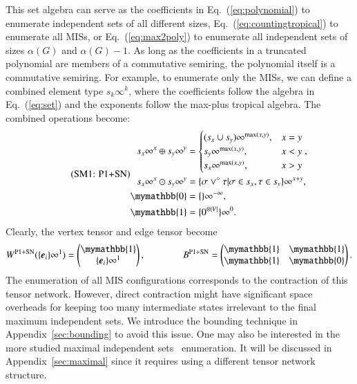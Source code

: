 \documentclass[onefignum, onetabnum]{siamart190516}
\newcommand{\eqname}[1]{\stepcounter{equation}\tag{\theequation : #1}}
\newcommand{\<}{\langle}
\renewcommand{\>}{\rangle}
\newcommand{\Eq}[1]{Eq.~(\ref{#1})}
\newcommand{\App}[1]{Appendix~\ref{#1}}
\newcounter{example}
\begin{document}
This set algebra can serve as the coefficients in \Eq{eq:polynomial} to enumerate independent sets of all different sizes, \Eq{eq:countingtropical} to enumerate all MISs, or \Eq{eq:max2poly} to enumerate all independent sets of sizes $\alpha(G)$ and $\alpha(G)-1$.
As long as the coefficients in a truncated polynomial are members of a commutative semiring, the polynomial itself is a commutative semiring.
For example, to enumerate only the MISs, we can define a combined element type $s_{k}\infty^k$, where the coefficients follow the algebra in \Eq{eq:set} and the exponents follow the max-plus tropical algebra.
The combined operations become: 
\begin{equation}
\eqname{P1+SN}
\begin{split}
    s_x\infty^x \oplus s_y\infty^y &= \begin{cases}
        (s_x \cup s_y)\infty^{\max(x,y)}, & x = y\\
        s_y\infty^{\max(x,y)}, & x < y\\
        s_x\infty^{\max(x,y)}, & x > y
    \end{cases},\\
    s_x\infty^x \odot s_y\infty^y &= \{\sigma \lor^\circ \tau | \sigma \in s_x, \tau \in s_y\}\infty^{x+y},\\
    \mymathbb{0} &= \{\}\infty^{-\infty},\\
    \mymathbb{1} &= \{0^{\otimes |V|}\}\infty^{0}. \label{eq:countingtropicalset}
\end{split}
\end{equation}
Clearly, the vertex tensor and edge tensor become
\begin{equation}
    W^{\rm P1+SN}(\{\boldsymbol{e}_{i}\}\infty^1) = \left(\begin{matrix}
        \mymathbb{1} \\
        \{\boldsymbol{e}_{i}\}\infty^1
    \end{matrix}\right),   
    \qquad \qquad
        B^{\rm P1+SN} = \left(\begin{matrix}
        \mymathbb{1}  & \mymathbb{1} \\
        \mymathbb{1} & \mymathbb{0}
    \end{matrix}\right).
\end{equation}
The enumeration of all MIS configurations corresponds to the contraction of this tensor network.
However, direct contraction might have significant space overheads for keeping too many intermediate states irrelevant to the final maximum independent sets.
We introduce the bounding technique in \App{sec:bounding} to avoid this issue.
One may also be interested in the more studied maximal independent sets~\cite{Bron1973, Eppstein2010, Johnson1988} enumeration.
It will be discussed in \App{sec:maximal} since it requires using a different tensor network structure.
\end{document}
